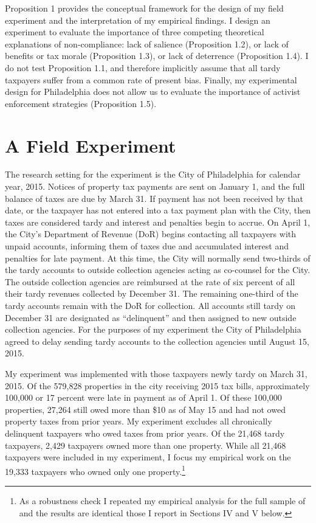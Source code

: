 Proposition 1 provides the conceptual framework for the design 
of my field experiment and the interpretation of my empirical findings. I design an experiment to evaluate the importance of three
competing theoretical explanations of non-compliance: lack of salience (Proposition 1.2), or lack of benefits or tax morale (Proposition 1.3), or lack of deterrence (Proposition 1.4). I do not test Proposition 1.1, and therefore implicitly assume that
all tardy taxpayers suffer from a common rate of present bias. Finally, my experimental design for Philadelphia does not allow us to evaluate the importance of 
activist enforcement strategies (Proposition 1.5). 

\section{A Field Experiment }


The research setting for the experiment is the City of Philadelphia
for calendar year, 2015.  Notices of property tax payments are sent on
January 1, and the full balance of taxes are due by March 31.  If
payment has not been received by that date, or the taxpayer has not
entered into a tax payment plan with the City, then taxes are
considered tardy and interest and penalties begin to accrue.  On
April 1, the City's Department of Revenue (DoR) begins contacting all
taxpayers with unpaid accounts, informing them of taxes due and
accumulated interest and penalties for late payment.  At this time,
the City will normally send two-thirds of the tardy accounts to outside collection agencies acting as co-counsel for the City. The outside collection agencies are reimbursed at the rate of six percent of all their tardy revenues collected by December 31. The remaining one-third of the tardy accounts remain with the DoR for collection. All accounts still tardy on December 31 are designated as ``delinquent'' and then assigned to new outside collection agencies. For the purposes of my experiment the City of Philadelphia agreed to delay sending tardy accounts to the collection agencies until August 15, 2015.

My experiment was implemented with those taxpayers newly tardy on March 31, 2015. Of the 579,828 properties in the city receiving 2015 tax bills, approximately 100,000 or 17 percent were late in payment as of April 1. Of these 100,000 properties, 27,264 still owed more than \$10 as of May 15 and had not owed property taxes from prior years. My experiment excludes all chronically delinquent taxpayers who owed taxes from prior years. Of the 21,468 tardy taxpayers, 2,429 taxpayers owned more than one property. While all 21,468 taxpayers were included in my experiment, I focus my empirical work on the 19,333 taxpayers who owned only one property.\footnote{ As a
  robustness check I repeated my empirical analysis for the full
  sample of and the results are identical those I report in Sections
  IV and V below. }  

